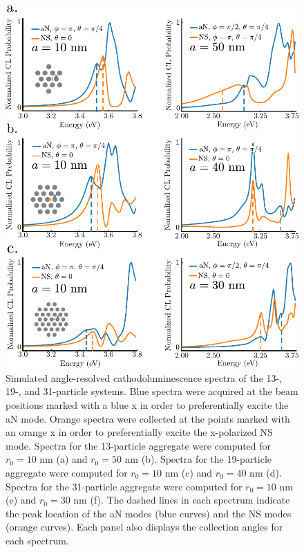 \documentclass[journal=apchd5,manuscript=article]{achemso}
\begin{document}
\begin{figure}
\includegraphics{kagan_CL_spectra.pdf}
\caption{Simulated angle-resolved cathodoluminescence spectra of the 13-, 19-, and 31-particle systems. Blue spectra were acquired at the beam positions marked with a blue x in order to preferentially excite the aN mode. Orange spectra were collected at the points marked with an orange x in order to preferentially excite the x-polarized NS mode. Spectra for the 13-particle aggregate were computed for $r_0 = 10$ nm (a) and $r_0 = 50$ nm (b). Spectra for the 19-particle aggregate were computed for $r_0 = 10$ nm (c) and $r_0 = 40$ nm (d). Spectra for the 31-particle aggregate were computed for $r_0 = 10$ nm (e) and $r_0 = 30$ nm (f). The dashed lines in each spectrum indicate the peak location of the aN modes (blue curves) and the NS modes (orange curves). Each panel also displays the collection angles for each spectrum.}
\label{kagan_CL}
\end{figure}
\end{document}
